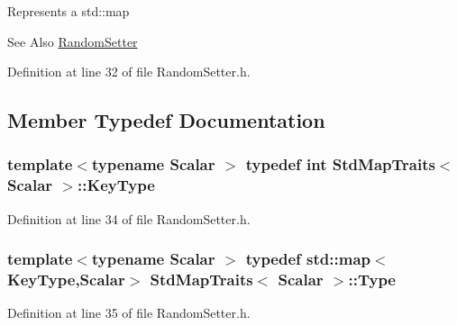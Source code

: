 Represents a std\-::map

\begin{DoxySeeAlso}{See Also}
\hyperlink{class_random_setter}{Random\-Setter} 
\end{DoxySeeAlso}


Definition at line 32 of file Random\-Setter.\-h.



\subsection{Member Typedef Documentation}
\hypertarget{struct_std_map_traits_aaf2a41e0ac3e1a466f0c7a398b47f93b}{
\subsubsection[{Key\-Type}]{\setlength{\rightskip}{0pt plus 5cm}template$<$typename Scalar $>$ typedef {\bf int} {\bf Std\-Map\-Traits}$<$ Scalar $>$\-::{\bf Key\-Type}}}\label{struct_std_map_traits_aaf2a41e0ac3e1a466f0c7a398b47f93b}


Definition at line 34 of file Random\-Setter.\-h.

\hypertarget{struct_std_map_traits_ab952e2bbbde3f9c01b1e07f1eb30f661}{
\subsubsection[{Type}]{\setlength{\rightskip}{0pt plus 5cm}template$<$typename Scalar $>$ typedef std\-::map$<${\bf Key\-Type},Scalar$>$ {\bf Std\-Map\-Traits}$<$ Scalar $>$\-::{\bf Type}}}\label{struct_std_map_traits_ab952e2bbbde3f9c01b1e07f1eb30f661}


Definition at line 35 of file Random\-Setter.\-h.



